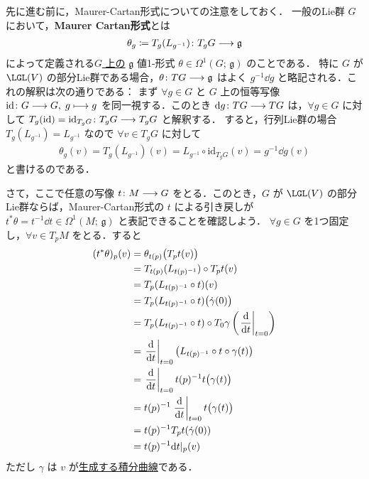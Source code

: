 \documentclass[TQFT_main]{subfiles}
\begin{document}
先に進む前に，Maurer-Cartan形式についての注意をしておく．
一般のLie群 $G$ において，\textbf{Maurer Cartan形式}とは
\begin{align}
    \theta_g \coloneqq T_g(L_{g^{-1}}) \colon T_g G \longrightarrow \mathfrak{g}
\end{align}
によって定義される\underline{$G$ 上の} $\mathfrak{g}$ 値1-形式 $\theta \in \Omega^1(G;\, \mathfrak{g})$ のことである．
特に $G$ が $\LGL (V)$ の部分Lie群である場合，$\theta \colon TG \longrightarrow \mathfrak{g}$ はよく $g^{-1} \dd g$ と略記される．これの解釈は次の通りである：
まず $\forall g \in G$ と $G$ 上の恒等写像 $\mathrm{id} \colon G \longrightarrow G,\; g \longmapsto g$ を同一視する．このとき $\dd g \colon TG \longrightarrow TG$ は，$\forall g \in G$ に対して $T_g (\mathrm{id}) = \mathrm{id}_{T_g G} \colon T_g G \longrightarrow T_g G$ と解釈する．
すると，行列Lie群の場合 $T_g(L_{g^{-1}}) = L_{g^{-1}}$ なので $\forall v \in T_g G$ に対して
\begin{align}
    \theta_g(v) = T_g(L_{g^{-1}})(v) = L_{g^{-1}} \circ \mathrm{id}_{T_g G}(v) = g^{-1} \dd g(v)
\end{align}
と書けるのである．

さて，ここで任意の\cinfty 写像 $t \colon M \longrightarrow G$ をとる．このとき，$G$ が $\LGL (V)$ の部分Lie群ならば，Maurer-Cartan形式の $t$ による引き戻しが $t^* \theta = t^{-1} \dd t \in \Omega^1(M;\, \mathfrak{g})$ と表記できることを確認しよう．
$\forall g \in G$ を1つ固定し，$\forall v \in T_p M$ をとる．すると
\begin{align}
    (t^* \theta)_p (v)
    &= \theta_{t(p)} \bigl( T_p t (v) \bigr) \\
    &= T_{t(p)} (L_{t(p)^{-1}}) \circ T_p t (v) \\
    &= T_p (L_{t(p)^{-1}} \circ t)(v) \\
    &= T_p (L_{t(p)^{-1}} \circ t)\bigl(\dot{\gamma}(0)\bigr) \\
    &= T_p (L_{t(p)^{-1}} \circ t) \circ T_0 \gamma \left( \eval{\dv{}{t}}_{t=0} \right) \\
    &= \eval{\dv{}{t}}_{t=0} \bigl( L_{t(p)^{-1}} \circ t \circ \gamma(t) \bigr) \\
    &= \eval{\dv{}{t}}_{t=0} t(p)^{-1} t \bigl( \gamma(t) \bigr) \\
    &= t(p)^{-1} \eval{\dv{}{t}}_{t=0} t\bigl( \gamma(t) \bigr) \\
    &= t(p)^{-1} T_p t (\dot{\gamma}(0)) \\
    &= t(p)^{-1} \dd t|_p (v)
\end{align}
ただし $\gamma$ は $v$ が\hyperref[thm:fundamental-flow]{生成する積分曲線}である．
\end{document}
